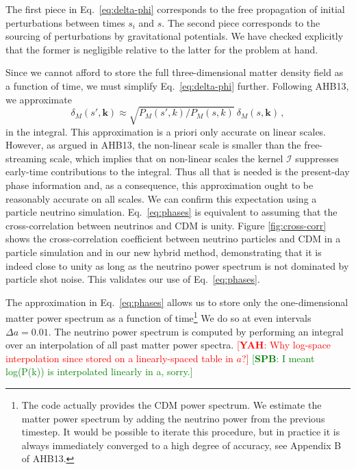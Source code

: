 \documentclass[useAMS, usenatbib]{mnras}
\newcommand{\bs}{\mathbf}
\newcommand{\spb}[1]{{\textcolor{green}{[{\bf SPB}: #1]}}}
\newcommand{\yah}[1]{{\textcolor{red}{[{\bf YAH}: #1]}}}
\begin{document}
The first piece in Eq.~\eqref{eq:delta-phi} corresponds to the free propagation of initial perturbations between times $s_i$ and $s$. The second piece corresponds to the sourcing of perturbations by gravitational potentials. We have checked explicitly that the former is negligible relative to the latter for the problem at hand.


Since we cannot afford to store the full three-dimensional matter density field as a function of time, we must simplify Eq.~\eqref{eq:delta-phi} further. Following AHB13, we approximate
\begin{equation}
 \delta_M(s', \bs{k}) \approx \sqrt{P_M(s', k)/P_M(s, k)}~ \delta_M(s, \bs{k})\,,
 \label{eq:phases}
\end{equation}
in the integral. This approximation is a priori only accurate on linear scales. However, as argued in AHB13, the non-linear scale is smaller than the free-streaming scale, which implies that on non-linear scales the kernel $\mathcal{I}$ suppresses early-time contributions to the integral. Thus all that is needed is the present-day phase information and, as a consequence, this approximation ought to be reasonably accurate on all scales. We can confirm this expectation using a particle neutrino simulation. Eq.~\ref{eq:phases} is equivalent to assuming that the cross-correlation between neutrinos and CDM is unity. Figure \ref{fig:cross-corr} shows the cross-correlation coefficient between neutrino particles and CDM in a particle simulation and in our new hybrid method, demonstrating that it is indeed close to unity as long as the neutrino power spectrum is not dominated by particle shot noise. This validates our use of Eq.~\ref{eq:phases}.

The approximation in Eq.~\ref{eq:phases} allows us to store only the one-dimensional matter power spectrum as a function of time\footnote{The code actually provides the CDM power spectrum. We estimate the matter power spectrum by adding the neutrino power from the previous timestep. It would be possible to iterate this procedure, but in practice it is always immediately converged to a high degree of accuracy, see Appendix B of AHB13.} We do so at even intervals $\Delta a = 0.01$. The neutrino power spectrum is computed by performing an integral over an interpolation of all past matter power spectra. \yah{Why log-space interpolation since stored on a linearly-spaced table in $a$?} \spb{I meant log(P(k)) is interpolated linearly in a, sorry.}
\end{document}
